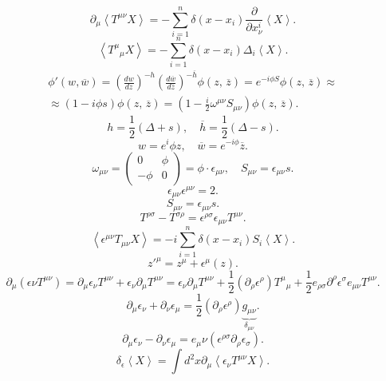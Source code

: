 \documentclass[a4paper]{article}
\begin{document}
\[
	\partial_\mu \left<T^{\mu\nu} X\right> =  - \sum_{i=1}^{n} \delta(x-x_i) \frac{\partial }{\partial x^i_\nu} \left<X \right>
.\] 
\[
	\left<T^\mu{}_\mu X \right> =
	-\sum_{i=1}^{n} \delta(x-x_i)\Delta_i
	\left<X \right>
.\] 
\begin{multline*}
	\phi'\left(w,\overline{w}\right)=
	\left( \frac{dw}{dz} \right) ^{-h}
	\left(\frac{d \overline{w}}{d \overline{z}}\right)^{-\overline{h}} \phi \left( z,\,\overline{z} \right) =
	e^{- i \phi S}\phi\left( z,\,\overline{z} \right) 
	\approx \\ \approx(1- i \phi s) \phi \left( z,\,\overline{z} \right) = \left(1- \frac{i}{2} \omega^{\mu \nu} S_{\mu\nu}\right)
	\phi\left( z,\,\overline{z} \right) 
.\end{multline*} 
\[
	h=\frac{1}{2} (\Delta+s),\quad \overline{h}
	=\frac{1}{2} (\Delta-s)
.\] 
\[
w=e^i\phi z,\quad \overline{w} =e^{- i \phi} \overline{z}
.\] 
\[
	\omega_{\mu\nu}= \begin{pmatrix} 0 & \phi \\ -\phi &0 \end{pmatrix} =\phi \cdot \epsilon _{\mu\nu},\quad
	S_{\mu\nu}= \epsilon_{\mu\nu}s
.\] 
\[
\epsilon_{\mu\nu}\epsilon^{\mu\nu}=2
.\] 
\[
S_{\mu\nu}=\epsilon_{\mu\nu}s
.\] 
\[
T^{\rho\sigma}- T^{\sigma\rho}=\epsilon^{\rho\sigma}
\epsilon_{\mu\nu} T^{\mu\nu}
.\] 
\[
\left<\epsilon^{\mu\nu} T_{\mu\nu}X \right> =
- i \sum_{i=1}^{n} \delta (x-x_i) S_i \left<X \right>
.\] 
\[
	z'^\mu =z^\mu +\epsilon ^\mu (z)
.\] 
\[
	\partial_\mu \left( \epsilon\nu T^{\mu\nu} \right) =
	\partial_{\mu} \epsilon_{\nu} T^{\mu\nu}+
	\epsilon_\nu \partial_{\mu} T^{\mu\nu}=
	\epsilon_\nu \partial_\mu T^{\mu\nu}+\frac{1}{2}
	\left( \partial_\rho \epsilon^\rho \right) 
	T^\mu {}_\mu + \frac{1}{2} e_{\rho \sigma}
	\partial^\rho \epsilon^\sigma e_{\mu\nu}
	T^{\mu\nu}
.\] 
\[
\partial_\mu \epsilon_\nu +\partial_\nu \epsilon_\mu=
\frac{1}{2} \left( \partial_\rho \epsilon^\rho \right) \underbrace{g_{\mu\nu}}_{\delta_{\mu\nu}}
.\] 
\[
\partial_\mu \epsilon_\nu -\partial_\nu \epsilon_\mu=
e_\mu\nu \left( \epsilon^{\rho\sigma}\partial_\rho
\epsilon_\sigma \right) 
.\] 
\[
\delta_\epsilon \left< X \right> =
\int d^2 x \partial_\mu \left<\epsilon_\nu T^{\mu\nu} X \right>
.\] 
\end{document}
